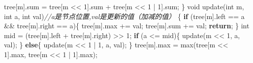 \documentclass[
]{article}
\newenvironment{Shaded}{}{}
\newcommand{\CommentTok}[1]{\textcolor[rgb]{0.38,0.63,0.69}{\textit{#1}}}
\newcommand{\ControlFlowTok}[1]{\textcolor[rgb]{0.00,0.44,0.13}{\textbf{#1}}}
\newcommand{\DataTypeTok}[1]{\textcolor[rgb]{0.56,0.13,0.00}{#1}}
\newcommand{\DecValTok}[1]{\textcolor[rgb]{0.25,0.63,0.44}{#1}}
\newcommand{\NormalTok}[1]{#1}
\newcommand{\OperatorTok}[1]{\textcolor[rgb]{0.40,0.40,0.40}{#1}}
\begin{document}
\begin{Shaded}
\begin{Highlighting}[]
\NormalTok{    tree}\OperatorTok{[}\NormalTok{m}\OperatorTok{].}\NormalTok{sum }\OperatorTok{=}\NormalTok{ tree}\OperatorTok{[}\NormalTok{m }\OperatorTok{\textless{}\textless{}} \DecValTok{1}\OperatorTok{].}\NormalTok{sum }\OperatorTok{+}\NormalTok{ tree}\OperatorTok{[}\NormalTok{m }\OperatorTok{\textless{}\textless{}} \DecValTok{1} \OperatorTok{|} \DecValTok{1}\OperatorTok{].}\NormalTok{sum}\OperatorTok{;}
\OperatorTok{\}}
\DataTypeTok{void}\NormalTok{ update}\OperatorTok{(}\DataTypeTok{int}\NormalTok{ m}\OperatorTok{,} \DataTypeTok{int}\NormalTok{ a}\OperatorTok{,} \DataTypeTok{int}\NormalTok{ val}\OperatorTok{)}\CommentTok{//a是节点位置,val是更新的值（加减的值）}
\OperatorTok{\{}
    \ControlFlowTok{if} \OperatorTok{(}\NormalTok{tree}\OperatorTok{[}\NormalTok{m}\OperatorTok{].}\NormalTok{left }\OperatorTok{==}\NormalTok{ a }\OperatorTok{\&\&}\NormalTok{ tree}\OperatorTok{[}\NormalTok{m}\OperatorTok{].}\NormalTok{right }\OperatorTok{==}\NormalTok{ a}\OperatorTok{)\{}
\NormalTok{        tree}\OperatorTok{[}\NormalTok{m}\OperatorTok{].}\NormalTok{max }\OperatorTok{+=}\NormalTok{ val}\OperatorTok{;}
\NormalTok{        tree}\OperatorTok{[}\NormalTok{m}\OperatorTok{].}\NormalTok{sum }\OperatorTok{+=}\NormalTok{ val}\OperatorTok{;}
        \ControlFlowTok{return}\OperatorTok{;}
    \OperatorTok{\}}
    \DataTypeTok{int}\NormalTok{ mid }\OperatorTok{=} \OperatorTok{(}\NormalTok{tree}\OperatorTok{[}\NormalTok{m}\OperatorTok{].}\NormalTok{left }\OperatorTok{+}\NormalTok{ tree}\OperatorTok{[}\NormalTok{m}\OperatorTok{].}\NormalTok{right}\OperatorTok{)} \OperatorTok{\textgreater{}\textgreater{}} \DecValTok{1}\OperatorTok{;}
    \ControlFlowTok{if} \OperatorTok{(}\NormalTok{a }\OperatorTok{\textless{}=}\NormalTok{ mid}\OperatorTok{)\{}
\NormalTok{        update}\OperatorTok{(}\NormalTok{m }\OperatorTok{\textless{}\textless{}} \DecValTok{1}\OperatorTok{,}\NormalTok{ a}\OperatorTok{,}\NormalTok{ val}\OperatorTok{);}
    \OperatorTok{\}}
    \ControlFlowTok{else}\OperatorTok{\{}
\NormalTok{        update}\OperatorTok{(}\NormalTok{m }\OperatorTok{\textless{}\textless{}} \DecValTok{1} \OperatorTok{|} \DecValTok{1}\OperatorTok{,}\NormalTok{ a}\OperatorTok{,}\NormalTok{ val}\OperatorTok{);}
    \OperatorTok{\}}
\NormalTok{    tree}\OperatorTok{[}\NormalTok{m}\OperatorTok{].}\NormalTok{max }\OperatorTok{=}\NormalTok{ max}\OperatorTok{(}\NormalTok{tree}\OperatorTok{[}\NormalTok{m }\OperatorTok{\textless{}\textless{}} \DecValTok{1}\OperatorTok{].}\NormalTok{max}\OperatorTok{,}\NormalTok{ tree}\OperatorTok{[}\NormalTok{m }\OperatorTok{\textless{}\textless{}} \DecValTok{1} \OperatorTok{|} \DecValTok{1}\OperatorTok{].}\NormalTok{max}\OperatorTok{);}

\end{Highlighting}
\end{Shaded}
\end{document}
